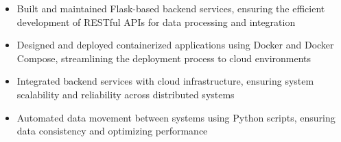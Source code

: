 \par\bigskip
{}
\par\smallskip
\begin{minipage}{13.75cm}
  \begin{minipage}{6.5cm}
    \begin{itemize}
      \item Built and maintained Flask-based backend services, ensuring the efficient development of RESTful APIs for data processing and integration
      \item Designed and deployed containerized applications using Docker and Docker Compose, streamlining the deployment process to cloud environments
    \end{itemize}
  \end{minipage}
  \hfill
  \begin{minipage}{6.5cm}
    \begin{itemize}
      \item Integrated backend services with cloud infrastructure, ensuring system scalability and reliability across distributed systems
      \item Automated data movement between systems using Python scripts, ensuring data consistency and optimizing performance
    \end{itemize}
  \end{minipage}
\end{minipage}
\par\smallskip
\divider

